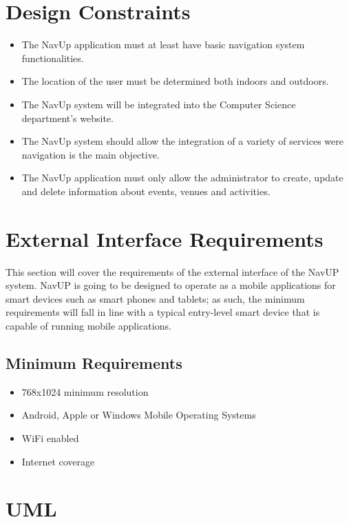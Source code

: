 \documentclass[12pt,a4paper]{article}
\begin{document}


\tableofcontents
\newpage

\section{Design Constraints}
	\begin{itemize}
		\item The NavUp application must at least have basic navigation system functionalities.
		\item The location  of the user must be determined both indoors and outdoors.
		\item The NavUp system will be integrated into the Computer Science department's website.
		\item The NavUp system should allow the integration of a variety of services were navigation is the main objective.
		\item The NavUp application must only allow the administrator to create, update and delete information about events, venues and activities.
		
	\end{itemize}
    
\section{External Interface Requirements}
This section will cover the requirements of the external interface of the NavUP system. NavUP is going to be designed to operate as a mobile applications for smart devices such as smart phones and tablets; as such, the minimum requirements will fall in line with a typical entry-level smart device that is capable of running mobile applications.\newline

    \subsection{Minimum Requirements}
        \begin{itemize}
            \item 768x1024 minimum resolution
            \item Android, Apple or Windows Mobile Operating Systems
            \item WiFi enabled
            \item Internet coverage
        \end{itemize}
	
\section{UML}
\end{document}
